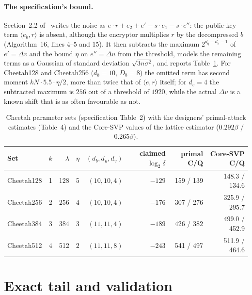 \documentclass[11pt,a4paper]{article}
\theoremstyle{definition}
\theoremstyle{remark}
\newcommand{\dfr}{\delta}
\begin{document}
\paragraph{The specification's bound.}
Section~2.2 of~\cite{Cheetah} writes the noise as
$e\cdot r+e_2+e'-s\cdot e_1-s\cdot e''$: the public-key term
$\langle e_b,r\rangle$ is absent, although the encryptor multiplies $r$ by the
decompressed $b$ (Algorithm~16, lines 4--5 and 15). It then subtracts the
maximum $2^{d_q-d_v-1}$ of $e'=\Delta v$ and the bound $\eta$ on $e''=\Delta u$
from the threshold, models the remaining terms as a Gaussian of standard
deviation $\sqrt{3n\sigma^2}$, and reports Table~\ref{tab:cheetah}. For
Cheetah128 and Cheetah256 ($d_b=10$, $D_b=8$) the omitted term has second
moment $kN\cdot 5.5\cdot\eta/2$, more than twice that of
$\langle e,r\rangle$ itself;
for $d_v=4$ the subtracted maximum is $256$ out of a threshold of $1920$,
while the actual $\Delta v$ is a known shift that is as often favourable as
not.

\begin{table}[t]
\centering\small
\begin{tabular}{lrrrrrrr}
\toprule
Set & $k$ & $\lambda$ & $\eta$ & $(d_b,d_u,d_v)$ & claimed $\log_2\dfr$ & primal C/Q & Core-SVP C/Q\\
\midrule
Cheetah128 & 1 & 128 & 5 & $(10,10,4)$ & $-129$ & 159 / 139 & 148.3 / 134.6\\
Cheetah256 & 2 & 256 & 4 & $(10,10,4)$ & $-176$ & 307 / 276 & 325.9 / 295.7\\
Cheetah384 & 3 & 384 & 3 & $(11,11,4)$ & $-189$ & 426 / 382 & 499.0 / 452.9\\
Cheetah512 & 4 & 512 & 2 & $(11,11,8)$ & $-243$ & 541 / 497 & 511.9 / 464.6\\
\bottomrule
\end{tabular}
\caption{Cheetah parameter sets (specification Table~2) with the
designers' primal-attack estimates (Table~4) and the Core-SVP values of the
lattice estimator ($0.292\beta$ / $0.265\beta$).}
\label{tab:cheetah}
\end{table}

\section{Exact tail and validation}
\label{sec:cheetahexact}
\end{document}
